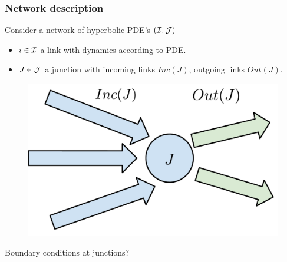 \begin{frame}
\frametitle{Network description}

Consider a network of hyperbolic PDE's $(\mathcal{I}, \mathcal{J})$

\begin{itemize}
    \item $i \in \mathcal{I}$ a link with dynamics according to PDE.
    \item $J \in \mathcal{J}$ a junction with incoming links $Inc(J)$, outgoing links $Out(J)$.
\end{itemize}

\begin{figure}
\includegraphics[width=.7\columnwidth]{figs-gen/junctions}
\end{figure}

Boundary conditions at junctions?
\end{frame}